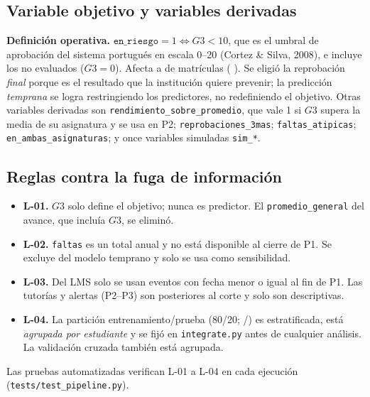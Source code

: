 \documentclass[11pt,a4paper]{article}
\begin{document}
\subsection{Variable objetivo y variables derivadas}
\textbf{Definición operativa.} $\texttt{en\_riesgo} = 1 \iff G3 < 10$, que es el umbral de
aprobación del sistema portugués en escala 0–20 (Cortez \& Silva, 2008), e incluye los no evaluados
($G3=0$). Afecta a \nRiesgo{} de \nFilasDs{} matrículas (\prevTot{} \prevIcTot{}). Se eligió la
reprobación \emph{final} porque es el resultado que la institución quiere prevenir; la
predicción \emph{temprana} se logra restringiendo los predictores, no redefiniendo el objetivo.
Otras variables derivadas son \texttt{rendimiento\_sobre\_promedio}, que vale 1 si $G3$ supera la
media de su asignatura y se usa en P2; \texttt{reprobaciones\_3mas}; \texttt{faltas\_atipicas};
\texttt{en\_ambas\_asignaturas}; y once variables simuladas \texttt{sim\_*}.

\subsection{Reglas contra la fuga de información}
\begin{itemize}
\item \textbf{L-01.} $G3$ solo define el objetivo; nunca es predictor. El \texttt{promedio\_general} del avance, que incluía $G3$, se eliminó.
\item \textbf{L-02.} \texttt{faltas} es un total anual y no está disponible al cierre de P1. Se excluye del modelo temprano y solo se usa como sensibilidad.
\item \textbf{L-03.} Del LMS solo se usan eventos con fecha menor o igual al fin de P1. Las tutorías y alertas (P2–P3) son posteriores al corte y solo son descriptivas.
\item \textbf{L-04.} La partición entrenamiento/prueba (80/20; \nTrain{}/\nTest{}) es estratificada, está \emph{agrupada por estudiante} y se fijó en \texttt{integrate.py} antes de cualquier análisis. La validación cruzada también está agrupada.
\end{itemize}
Las pruebas automatizadas verifican L-01 a L-04 en cada ejecución (\texttt{tests/test\_pipeline.py}).
\end{document}
